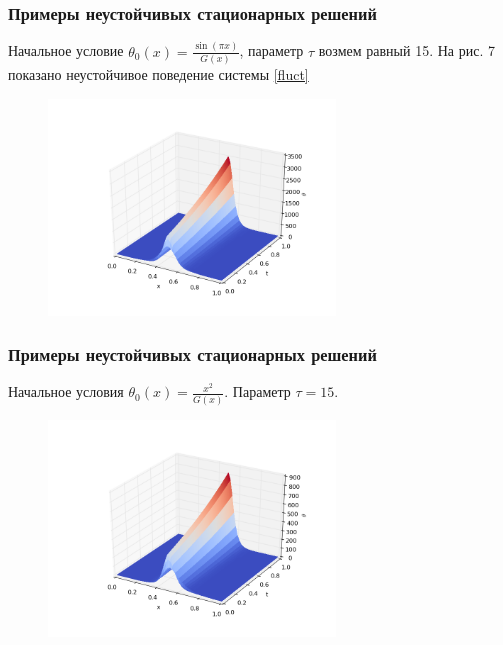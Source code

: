 \documentclass{beamer}
\begin{document}
\begin{frame}
    \frametitle{Примеры неустойчивых стационарных решений}

    Начальное условие $\theta_0(x) = \frac{\sin(\pi x)}{G(x)}$, параметр $\tau$ 
    возмем равный 15. На рис. 7 показано неустойчивое поведение системы
    \eqref{fluct}

    \begin{figure}[H]
        \centering
        \includegraphics[width=3in]{ex_s15}
        \caption{}
    \end{figure}

\end{frame}

\begin{frame}
    \frametitle{Примеры неустойчивых стационарных решений}

    Начальное условия $\theta_0(x) = \frac{x^2}{G(x)}$. Параметр $\tau = 15$.

    \begin{figure}[H]
        \centering
        \includegraphics[width=3in]{ex_x2_s15}
        \caption{}
    \end{figure}

\end{frame}
\end{document}

